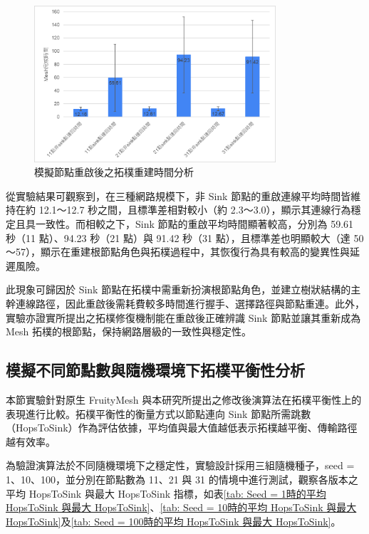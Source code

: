 \begin{ZhChapter}
\begin{figure}[H]
    \centering
    \includegraphics[width = 0.8\textwidth]{image/節點重啟後之拓樸重建時間分析.png}
    \caption{模擬節點重啟後之拓樸重建時間分析}
    \label{fig: 節點重啟後之拓樸重建時間分析}
\end{figure}

從實驗結果可觀察到，在三種網路規模下，非 Sink 節點的重啟連線平均時間皆維持在約 12.1～12.7 秒之間，且標準差相對較小（約 2.3～3.0），顯示其連線行為穩定且具一致性。而相較之下，Sink 節點的重啟平均時間顯著較高，分別為 59.61 秒（11 點）、94.23 秒（21 點）與 91.42 秒（31 點），且標準差也明顯較大（達 50～57），顯示在重建根節點角色與拓樸過程中，其恢復行為具有較高的變異性與延遲風險。

此現象可歸因於 Sink 節點在拓樸中需重新扮演根節點角色，並建立樹狀結構的主幹連線路徑，因此重啟後需耗費較多時間進行握手、選擇路徑與節點重連。此外，實驗亦證實所提出之拓樸修復機制能在重啟後正確辨識 Sink 節點並讓其重新成為 Mesh 拓樸的根節點，保持網路層級的一致性與穩定性。

\subsection{模擬不同節點數與隨機環境下拓樸平衡性分析}
本節實驗針對原生 FruityMesh 與本研究所提出之修改後演算法在拓樸平衡性上的表現進行比較。拓樸平衡性的衡量方式以節點連向 Sink 節點所需跳數（HopsToSink）作為評估依據，平均值與最大值越低表示拓樸越平衡、傳輸路徑越有效率。

為驗證演算法於不同隨機環境下之穩定性，實驗設計採用三組隨機種子，seed = 1、10、100，並分別在節點數為 11、21 與 31 的情境中進行測試，觀察各版本之平均 HopsToSink 與最大 HopsToSink 指標，如表\ref{tab: Seed = 1時的平均 HopsToSink 與最大 HopsToSink}、\ref{tab: Seed = 10時的平均 HopsToSink 與最大 HopsToSink}及\ref{tab: Seed = 100時的平均 HopsToSink 與最大 HopsToSink}。


\end{ZhChapter}
